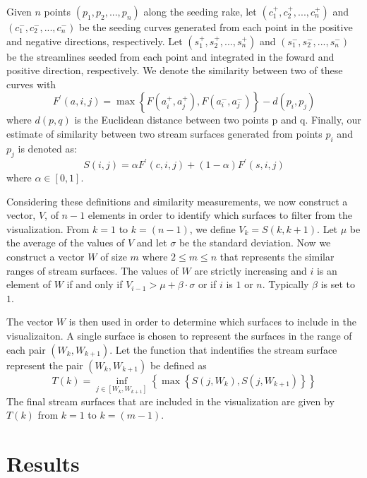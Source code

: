 \documentclass{vgtc}                          %
\begin{document}
Given $n$ points $(p_1, p_2, ... , p_n)$ along the seeding rake, let $(c_1^+, c_2^+, ... , c_n^+)$ and $(c_1^-, c_2^-, ... , c_n^-)$ be the seeding curves generated from each point in the positive and negative directions, respectively.
Let $(s_1^+, s_2^+, ... , s_n^+)$ and $(s_1^-, s_2^-, ... , s_n^-)$ be the streamlines seeded from each point and integrated in the foward and positive direction, respectively.
We denote the similarity between two of these curves with
\begin{displaymath}
F^\prime(a, i, j) = \max \left\{F(a_i^+, a_j^+), F(a_i^-, a_j^-)\right\} - d(p_i, p_j)
\end{displaymath}
where $d(p, q)$ is the Euclidean distance between two points p and q.
Finally, our estimate of similarity between two stream surfaces generated from points $p_i$ and $p_j$ is denoted as:
\begin{displaymath}
S(i, j) = \alpha F^\prime(c, i, j) + (1 - \alpha) F^\prime(s, i, j)
\end{displaymath}
where $\alpha \in [0, 1]$.

Considering these definitions and similarity measurements, we now construct a vector, $V$, of $n - 1$ elements in order to identify which surfaces to filter from the visualization.
From $k = 1$ to $k = (n - 1)$, we define $V_k = S(k, k + 1)$.
Let $\mu$ be the average of the values of $V$ and let $\sigma$ be the standard deviation.
Now we construct a vector $W$ of size $m$ where $2 \leq m \leq n$ that represents the similar ranges of stream surfaces.
The values of $W$ are strictly increasing and $i$ is an element of $W$ if and only if $V_{i - 1} > \mu + \beta \cdot \sigma$ or if $i$ is $1$ or $n$.
Typically $\beta$ is set to $1$.

The vector $W$ is then used in order to determine which surfaces to include in the visualizaiton.
A single surface is chosen to represent the surfaces in the range of each pair $(W_k, W_{k + 1})$.
Let the function that indentifies the stream surface represent the pair $(W_k, W_{k + 1})$ be defined as
\begin{displaymath}
T(k) = \inf_{j \in [W_k, W_{k + 1}]} \left\{ \max \left\{ S(j, W_k), S(j, W_{k+1}) \right\} \right\}
\end{displaymath}
The final stream surfaces that are included in the visualization are given by $T(k)$ from $k = 1$ to $k = (m - 1)$.

\section{Results} \label{sec:results}
\end{document}
